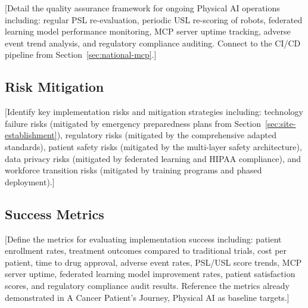 [Detail the quality assurance framework for ongoing Physical AI operations
including: regular PSL re-evaluation, periodic USL re-scoring of robots,
federated learning model performance monitoring, MCP server uptime tracking,
adverse event trend analysis, and regulatory compliance auditing. Connect to
the CI/CD pipeline from Section~\ref{sec:national-mcp}.]

\subsection{Risk Mitigation}
\label{subsec:impl-risk}

[Identify key implementation risks and mitigation strategies including:
technology failure risks (mitigated by emergency preparedness plans from
Section~\ref{sec:site-establishment}), regulatory risks (mitigated by the
comprehensive adapted standards), patient safety risks (mitigated by the
multi-layer safety architecture), data privacy risks (mitigated by federated
learning and HIPAA compliance), and workforce transition risks (mitigated by
training programs and phased deployment).]

\subsection{Success Metrics}
\label{subsec:impl-metrics}

[Define the metrics for evaluating implementation success including:
patient enrollment rates, treatment outcomes compared to traditional trials,
cost per patient, time to drug approval, adverse event rates, PSL/USL score
trends, MCP server uptime, federated learning model improvement rates,
patient satisfaction scores, and regulatory compliance audit results.
Reference the metrics already demonstrated in A Cancer Patient's Journey,
Physical AI \cite{patient-journey-paper} as baseline targets.]
